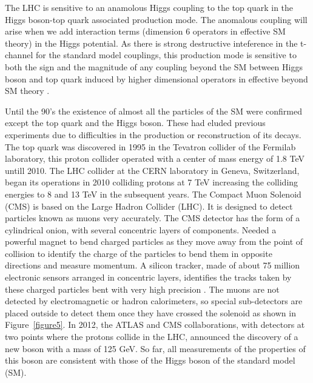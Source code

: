 \documentclass[final,3p]{CSP}
\begin{document}
The LHC is sensitive to an anamolous Higgs coupling to the top quark in the Higgs boson-top quark associated production mode. 
The anomalous coupling will arise when we add interaction terms (dimension 6 operators in effective SM theory) in the Higgs potential.
As there is strong destructive inteference in the t-channel for the standard model  couplings, this production mode is sensitive to both the sign and the magnitude of any coupling beyond the SM between Higgs  boson and top quark induced by  higher dimensional operators in effective beyond SM theory \cite{sirunyan2019search}.

Until the 90's the existence of almost all the particles of the SM were confirmed except the top quark and the Higgs boson. 
These had eluded previous experiments due to difficulties in the production or reconstruction of its decays. The top quark was 
discovered in 1995 in the Tevatron collider of the Fermilab laboratory, this proton collider operated with a center of mass 
energy of 1.8 TeV untill 2010. The LHC collider at the CERN laboratory in Geneva, Switzerland, began its operations in 2010 
colliding protons at 7 TeV increasing the colliding energies to 8 and 13 TeV in the subsequent years. The Compact Muon Solenoid (CMS) is based on the Large Hadron Collider (LHC). It is designed to detect particles known as muons very accurately. The CMS detector has the form of a cylindrical onion, with several concentric layers of components. Needed a powerful magnet to bend charged particles as they move away from the point of collision to identify the charge of the particles to bend them in opposite directions and measure momentum. A silicon tracker, made of about 75 
million electronic sensors arranged in concentric layers, identifies the tracks taken by these charged particles bent with very high precision \cite{Chatrchyan:2008aa}. The muons are not detected by electromagnetic or hadron calorimeters, so special sub-detectors are placed outside to detect them once they have crossed the solenoid as shown in Figure~\ref{figure5}. In 2012, the ATLAS and CMS collaborations, with detectors at two points where the protons collide in the LHC, announced the discovery of a new boson with a mass of 125 GeV. So far, all measurements of the properties of this boson are consistent with those of the Higgs boson of the standard model (SM).
\end{document}
